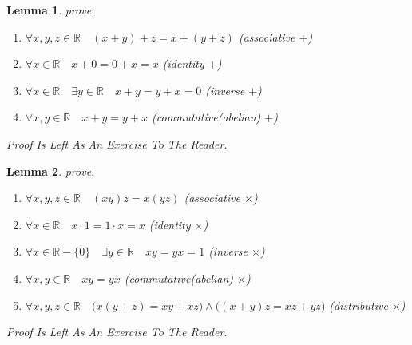 \documentclass[10pt,a4paper]{book}
\newtheorem{lemma}{Lemma}[section]
\begin{document}
\begin{lemma}prove.
    \begin{enumerate}
        \setlength{\itemsep}{0pt} %
        \item       $\forall x ,y ,z  \in \mathbb{R} \quad (x +y )+z  = x +(y +z )  $  (associative $+$)
        \item       $\forall x \in \mathbb{R} \quad x + 0 = 0 + x = x$  (identity  $+$)
        \item       $\forall x \in \mathbb{R} \quad \exists y \in \mathbb{R} \quad x + y = y + x = 0$ (inverse  $+$)
        \item       $\forall x ,y  \in \mathbb{R} \quad x +y  = y +x $  (commutative(abelian)  $+$)
    \end{enumerate}
    Proof Is Left As An Exercise To The Reader.
\end{lemma}

\begin{lemma}prove.
    \begin{enumerate}
        \setlength{\itemsep}{0pt} %
        \item       $\forall x ,y ,z  \in \mathbb{R} \quad (x   y )  z  = x  (y   z )  $  (associative $\times$)
        \item       $\forall x \in \mathbb{R} \quad x \cdot 1 = 1 \cdot x = x$  (identity  $\times$)
        \item       $\forall x  \in \mathbb{R} - \{0\} \quad \exists y \in \mathbb{R} \quad x  y = y  x = 1$  (inverse  $\times$)
        \item       $\forall x ,y  \in \mathbb{R} \quad x   y  = y   x $  (commutative(abelian)  $\times$)
        \item       $\forall x ,y ,z  \in \mathbb{R} \quad \Big(x   (y  + z ) = x   y  +  x   z  \Big)
                  \land     \Big((x  + y )  z  = x   z  +  y   z  \Big)  $  (distributive $\times$)
    \end{enumerate}
    Proof Is Left As An Exercise To The Reader.
\end{lemma}
\end{document}
